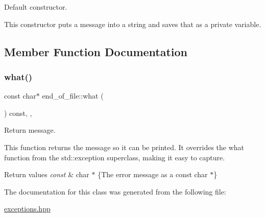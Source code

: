 Default constructor. 

This constructor puts a message into a string and saves that as a private variable. 

\subsection{Member Function Documentation}
\mbox{\label{classend__of__file_a32e8c4c2f39a8484c2f39f9a98d5dfb8}} 
\subsubsection{\texorpdfstring{what()}{what()}}
{\footnotesize\ttfamily const char$\ast$ end\+\_\+of\+\_\+file\+::what (\begin{DoxyParamCaption}{ }\end{DoxyParamCaption}) const\hspace{0.3cm}{\ttfamily [inline]}, {\ttfamily [override]}, {\ttfamily [noexcept]}}



Return message. 

This function returns the message so it can be printed. It overrides the what function from the std\+::exception superclass, making it easy to capture.


\begin{DoxyRetVals}{Return values}
{\em const} & char $\ast$ \{The error message as a const char $\ast$\} \\
\hline
\end{DoxyRetVals}


The documentation for this class was generated from the following file\+:\begin{DoxyCompactItemize}
\item 
\hyperlink{exceptions_8hpp}{exceptions.\+hpp}\end{DoxyCompactItemize}
